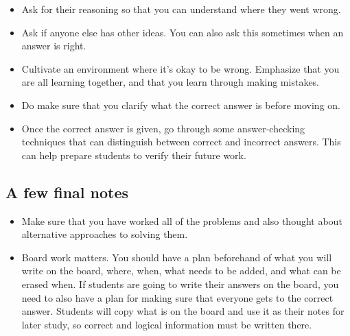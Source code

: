 \begin{itemize}
\item Ask for their reasoning so that you can understand where they went wrong.
\item Ask if anyone else has other ideas. You can also ask this sometimes when an answer is right.
\item Cultivate an environment where it’s okay to be wrong. Emphasize that you are all learning together, and that you learn through making mistakes.
\item Do make sure that you clarify what the correct answer is before moving on.
\item Once the correct answer is given, go through some answer-checking techniques that can distinguish between correct and incorrect answers. This can help prepare students to verify their future work.
\end{itemize}

\subsection{A few final notes}
\label{sec:few-final-notes}

\begin{itemize}
\item Make sure that you have worked all of the problems and also thought about alternative approaches to solving them.
\item Board work matters. You should have a plan beforehand of what you will write on the board, where, when, what needs to be added, and what can be erased when. If students are going to write their answers on the board, you need to also have a plan for making sure that everyone gets to the correct answer. Students will copy what is on the board and use it as their notes for later study, so correct and logical information must be written there.
\end{itemize}


